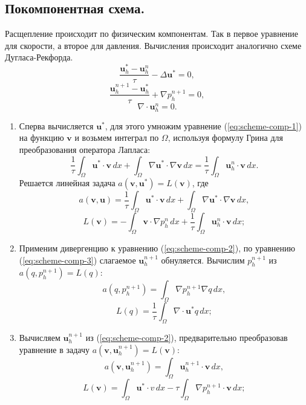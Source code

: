\documentclass[12pt]{article}
\begin{document}
\subsection{Покомпонентная схема.} Расщепление происходит по физическим компонентам. Так в первое уравнение для скорости, а второе для давления. Вычисления происходит аналогично схеме Дугласа-Рекфорда.
\begin{equation} \label{eq:scheme-comp-1}
\frac{{\bm u}_h^{*}-{\bm u}_h^n}{\tau} - \Delta{\bm u}^{*}=0,
\end{equation} 
\begin{equation} \label{eq:scheme-comp-2}
\frac{{\bm u}_h^{n+1}-{\bm u}_h^{*}}{\tau} + \nabla p_h^{n+1}=0,
\end{equation}
\begin{equation} \label{eq:scheme-comp-3}
\nabla \cdot {\bm u}_h^n = 0.
\end{equation}
\begin{enumerate}
\item 
Сперва вычисляется ${\bm u}^*$, для этого умножим уравнение (\ref{eq:scheme-comp-1}) на функцию $\bm v$ и возьмем интеграл по $\Omega$, используя формулу Грина для преобразования оператора Лапласа:
$$
\frac{1}{\tau}\int_{\Omega} {\bm u}^*\cdot {\bm v} \,dx + \int_{\Omega} \nabla {\bm u}^* \cdot \nabla {\bm v} \,dx = \frac{1}{\tau} \int_{\Omega} {\bm u}_h^{n} \cdot {\bm v} \,dx.
$$
Решается линейная задача $a({\bm v}, {\bm u}^*) = L({\bm v})$, где
$$
a({\bm v}, {\bm u}) = \frac{1}{\tau}\int_{\Omega} {\bm u}^*\cdot {\bm v} \,dx + \int_{\Omega} \nabla {\bm u}^* \cdot \nabla {\bm v} \,dx,
$$
$$
L({\bm v}) = -\int_{\Omega} {\bm v} \cdot \nabla p_h^{n} \,dx + \frac{1}{\tau} \int_{\Omega} {\bm u}_h^{n} \cdot {\bm v} \,dx;
$$
\item 
Применим дивергенцию к уравнению (\ref{eq:scheme-comp-2}), по уравнению (\ref{eq:scheme-comp-3}) слагаемое ${\bm u}_h^{n+1}$ обнуляется. Вычислим $p_h^{n+1}$ из $a(q, p_h^{n+1})=L(q)$:
$$
a(q, p_h^{n+1}) = \int_{\Omega} \nabla p_h^{n+1} \nabla q \,dx,
$$
$$
L(q) = \frac{1}{\tau} \int_{\Omega} \nabla \cdot {\bm u}^* q \,dx;
$$
\item 
Вычисляем ${\bm u}_h^{n+1}$ из (\ref{eq:scheme-comp-2}), предварительно преобразовав уравнение в задачу $a({\bm v}, {\bm u}_h^{n+1}) = L({\bm v})$:
$$
a({\bm v}, {\bm u}_h^{n+1}) = \int_{\Omega} {\bm u}_h^{n+1} \cdot {\bm v}\,dx,
$$
$$
L({\bm v}) = \int_{\Omega} {\bm u}^* \cdot v \,dx - \tau \int_{\Omega} \nabla p_h^{n+1} \cdot {\bm v} \,dx;
$$
\end{enumerate}
\end{document}
